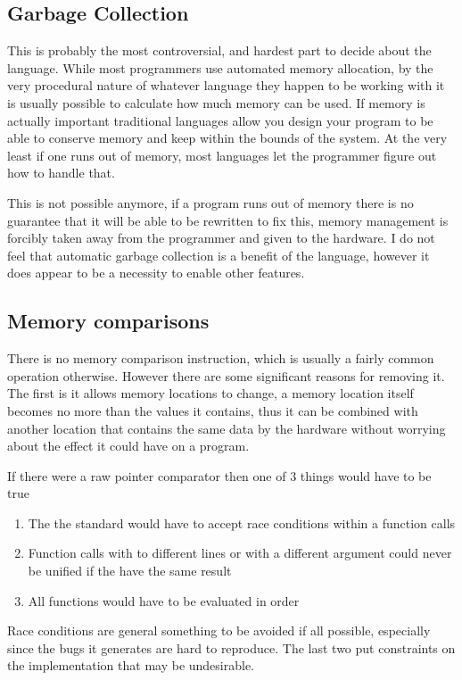 \documentclass[12pt,letterpaper]{report}
\begin{document}
\subsection{Garbage Collection}
This is probably the most controversial, and hardest part to decide about the language. While most programmers use automated memory allocation, by the very procedural nature of whatever language they happen to be working with it is usually possible to calculate how much memory can be used. If memory is actually important traditional languages allow you design your program to be able to conserve memory and keep within the bounds of the system. At the very least if one runs out of memory, most languages let the programmer figure out how to handle that.

This is not possible anymore, if a program runs out of memory there is no guarantee that it will be able to be rewritten to fix this, memory management is forcibly taken away from the programmer and given to the hardware. I do not feel that automatic garbage collection is a benefit of the language, however it does appear to be a necessity to enable other features.
\subsection{Memory comparisons}
There is no memory comparison instruction, which is usually a fairly common operation otherwise. However there are some significant reasons for removing it. The first is it allows memory locations to change, a memory location itself becomes no more than the values it contains, thus it can be combined with another location that contains the same data by the hardware without worrying about the effect it could have on a program.

If there were a raw pointer comparator then one of $3$ things would have to be true
\begin{enumerate}
\item The the standard would have to accept race conditions within a function calls 
\item Function calls with to different lines or with a different argument could never be unified if the have the same result
\item All functions would have to be evaluated in order
\end{enumerate}
Race conditions are general something to be avoided if all possible, especially since the bugs it generates are hard to reproduce. The last two put constraints on the implementation that may be undesirable.
\end{document}
